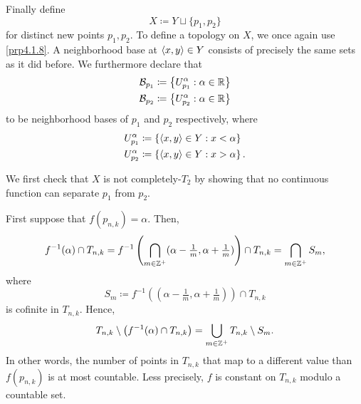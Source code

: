 \begin{exm}
Finally define
\begin{equation}
X\coloneqq Y\sqcup \{ p_1,p_2\}
\end{equation}
for distinct new points $p_1,p_2$.  To define a topology on $X$, we once again use \cref{prp4.1.8}.  A neighborhood base at $\langle x,y\rangle\in Y$ consists of precisely the same sets as it did before.  We furthermore declare that
\begin{equation}
\begin{split}
\mathcal{B}_{p_1} & \coloneqq \left\{ U_{p_1}^\alpha :\alpha \in \mathbb{R} \right\} \\
\mathcal{B}_{p_2} & \coloneqq \left\{ U_{p_2}^\alpha :\alpha \in \mathbb{R} \right\}
\end{split}
\end{equation}
to be neighborhood bases of $p_1$ and $p_2$ respectively, where
\begin{equation}
\begin{split}
U_{p_1}^\alpha & \coloneqq \left\{ \langle x,y\rangle\in Y:x<\alpha \right\} \\
U_{p_2}^\alpha & \coloneqq \left\{ \langle x,y\rangle\in Y:x>\alpha \right\} .
\end{split}
\end{equation}

We first check that $X$ is not completely-$T_2$ by showing that no continuous function can separate $p_1$ from $p_2$.

First suppose that $f(p_{n,k})=\alpha$.  Then,
\begin{equation}
f^{-1}(\alpha )\cap T_{n,k}=f^{-1}\left( \bigcap _{m\in \mathbb{Z} ^+}(\alpha -\tfrac{1}{m},\alpha +\tfrac{1}{m})\right) \cap T_{n,k}=\bigcap _{m\in \mathbb{Z} ^+}S_m,
\end{equation}
where
\begin{equation}
S_m\coloneqq f^{-1}((\alpha -\tfrac{1}{m},\alpha +\tfrac{1}{m}))\cap T_{n,k}
\end{equation}
is cofinite in $T_{n,k}$.  Hence,
\begin{equation}
T_{n,k}\setminus \left( f^{-1}(\alpha )\cap T_{n,k}\right) =\bigcup _{m\in \mathbb{Z} ^+}T_{n,k}\setminus S_m.
\end{equation}
In other words, the number of points in $T_{n,k}$ that map to a different value than $f(p_{n,k})$ is at most countable.  Less precisely, $f$ is constant on $T_{n,k}$ modulo a countable set.


\end{exm}
